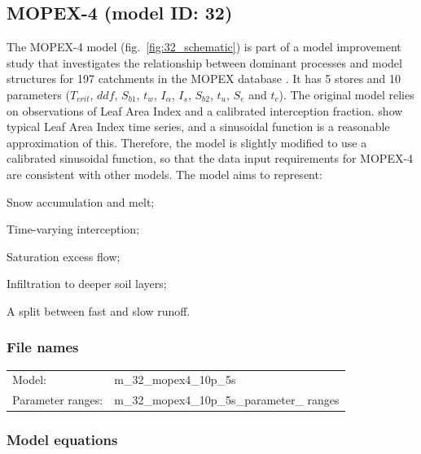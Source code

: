 \subsection{MOPEX-4 (model ID: 32)}
The MOPEX-4 model (fig.~\ref{fig:32_schematic}) is part of a model improvement study that investigates the relationship between dominant processes and model structures for 197 catchments in the MOPEX database \citep{Ye2012}. It has 5 stores and 10 parameters ($T_{crit}$, $ddf$, $S_{b1}$, $t_w$, $I_{\alpha}$, $I_{s}$, $S_{b2}$, $t_u$, $S_e$ and $t_c$). The original model relies on observations of Leaf Area Index and a calibrated interception fraction. \citet{Liang1994} show typical Leaf Area Index time series, and a sinusoidal function is a reasonable approximation of this. Therefore, the model is slightly modified to use a calibrated sinusoidal function, so that the data input requirements for MOPEX-4 are consistent with other models.  The model aims to represent:

\begin{itemizecompact}
\item Snow accumulation and melt;
\item Time-varying interception;
\item Saturation excess flow;
\item Infiltration to deeper soil layers;
\item A split between fast and slow runoff.
\end{itemizecompact}

\subsubsection{File names}
\begin{tabular}{@{}ll}
Model: &m\_32\_mopex4\_10p\_5s \\
Parameter ranges: &m\_32\_mopex4\_10p\_5s\_parameter\_ ranges \\
\end{tabular}

\subsubsection{Model equations}

